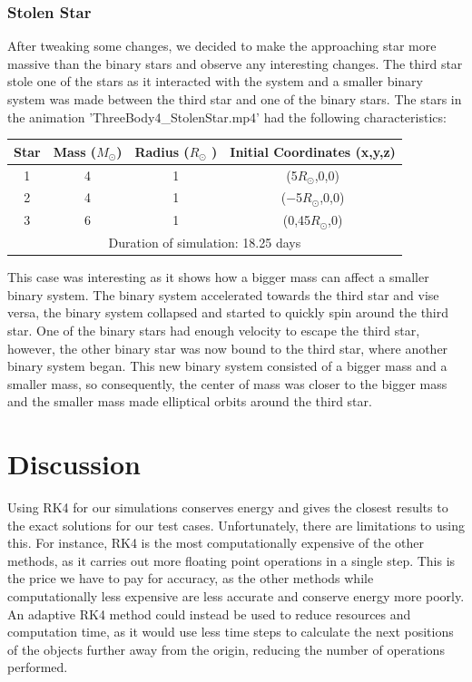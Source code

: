 \documentclass[10pt,letterpaper]{article}
\begin{document}
\subsubsection{Stolen Star}
After tweaking some changes, we decided to make the approaching star more massive than the binary stars and observe any interesting changes. The third star stole one of the stars as it interacted with the system and a smaller binary system was made between the third star and one of the binary stars. The stars in the animation 'ThreeBody4\_StolenStar.mp4' had the following characteristics:
\begin{table}[!htb]
\centering
\begin{tabular}{| c | c | c | c |}
\hline
Star & Mass ($M_{\odot}$) & Radius ($R_{\odot}$ ) & Initial Coordinates (x,y,z)\\
\hline
1 & 4 & 1 & (5$R_{\odot}$,0,0) \\
\hline
2 & 4 & 1 & ($-$5$R_{\odot}$,0,0) \\
\hline 
3 & 6 & 1 & (0,45$R_{\odot}$,0) \\
\hline
\multicolumn{4}{|c|}{Duration of simulation: 18.25 days} \\
\hline
\end{tabular}
\end{table}
This case was interesting as it shows how a bigger mass can affect a smaller binary system. The binary system accelerated towards the third star and vise versa, the binary system collapsed and started to quickly spin around the third star. One of the binary stars had enough velocity to escape the third star, however, the other binary star was now bound to the third star, where another binary system began. This new binary system consisted of a bigger mass and a smaller mass, so consequently, the center of mass was closer to the bigger mass and the smaller mass made elliptical orbits around the third star.

\pagebreak
\section{Discussion}

Using RK4 for our simulations conserves energy and gives the closest results to the exact solutions for our test cases. Unfortunately, there are limitations to using this. For instance, RK4 is the most computationally expensive of the other methods, as it carries out more floating point operations in a single step. This is the price we have to pay for accuracy, as the other methods while computationally less expensive are less accurate and conserve energy more poorly. An adaptive RK4 method could instead be used to reduce resources and computation time, as it would use less time steps to calculate the next positions of the objects further away from the origin, reducing the number of operations performed.\\
\end{document}
